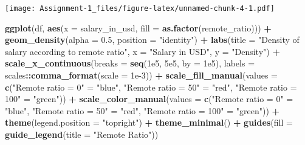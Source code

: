 \documentclass[
]{article}
\newenvironment{Shaded}{\begin{snugshade}}{\end{snugshade}}
\newcommand{\AttributeTok}[1]{\textcolor[rgb]{0.13,0.29,0.53}{#1}}
\newcommand{\FloatTok}[1]{\textcolor[rgb]{0.00,0.00,0.81}{#1}}
\newcommand{\FunctionTok}[1]{\textcolor[rgb]{0.13,0.29,0.53}{\textbf{#1}}}
\newcommand{\NormalTok}[1]{#1}
\newcommand{\OtherTok}[1]{\textcolor[rgb]{0.56,0.35,0.01}{#1}}
\newcommand{\SpecialCharTok}[1]{\textcolor[rgb]{0.81,0.36,0.00}{\textbf{#1}}}
\newcommand{\StringTok}[1]{\textcolor[rgb]{0.31,0.60,0.02}{#1}}
\begin{document}
\texttt{[image: Assignment-1\_files/figure-latex/unnamed-chunk-4-1.pdf]}

\begin{Shaded}
\begin{Highlighting}[]
\FunctionTok{ggplot}\NormalTok{(df, }\FunctionTok{aes}\NormalTok{(}\AttributeTok{x =}\NormalTok{ salary\_in\_usd, }\AttributeTok{fill =} \FunctionTok{as.factor}\NormalTok{(remote\_ratio))) }\SpecialCharTok{+}
  \FunctionTok{geom\_density}\NormalTok{(}\AttributeTok{alpha =} \FloatTok{0.5}\NormalTok{, }\AttributeTok{position =} \StringTok{"identity"}\NormalTok{) }\SpecialCharTok{+}
  \FunctionTok{labs}\NormalTok{(}\AttributeTok{title =} \StringTok{"Density of salary according to remote ratio"}\NormalTok{,}
       \AttributeTok{x =} \StringTok{"Salary in USD"}\NormalTok{,}
       \AttributeTok{y =} \StringTok{"Density"}\NormalTok{) }\SpecialCharTok{+}
  \FunctionTok{scale\_x\_continuous}\NormalTok{(}\AttributeTok{breaks =} \FunctionTok{seq}\NormalTok{(}\FloatTok{1e5}\NormalTok{, }\FloatTok{5e5}\NormalTok{, }\AttributeTok{by =} \FloatTok{1e5}\NormalTok{),}
                     \AttributeTok{labels =}\NormalTok{ scales}\SpecialCharTok{::}\FunctionTok{comma\_format}\NormalTok{(}\AttributeTok{scale =} \FloatTok{1e{-}3}\NormalTok{)) }\SpecialCharTok{+}
  \FunctionTok{scale\_fill\_manual}\NormalTok{(}\AttributeTok{values =} \FunctionTok{c}\NormalTok{(}\StringTok{"Remote ratio = 0"} \OtherTok{=} \StringTok{"blue"}\NormalTok{,}
                               \StringTok{"Remote ratio = 50"} \OtherTok{=} \StringTok{"red"}\NormalTok{,}
                               \StringTok{"Remote ratio = 100"} \OtherTok{=} \StringTok{"green"}\NormalTok{)) }\SpecialCharTok{+}
  \FunctionTok{scale\_color\_manual}\NormalTok{(}\AttributeTok{values =} \FunctionTok{c}\NormalTok{(}\StringTok{"Remote ratio = 0"} \OtherTok{=} \StringTok{"blue"}\NormalTok{,}
                                \StringTok{"Remote ratio = 50"} \OtherTok{=} \StringTok{"red"}\NormalTok{,}
                                \StringTok{"Remote ratio = 100"} \OtherTok{=} \StringTok{"green"}\NormalTok{)) }\SpecialCharTok{+}
  \FunctionTok{theme}\NormalTok{(}\AttributeTok{legend.position =} \StringTok{"topright"}\NormalTok{) }\SpecialCharTok{+}
  \FunctionTok{theme\_minimal}\NormalTok{() }\SpecialCharTok{+} 
  \FunctionTok{guides}\NormalTok{(}\AttributeTok{fill =} \FunctionTok{guide\_legend}\NormalTok{(}\AttributeTok{title =} \StringTok{"Remote Ratio"}\NormalTok{))}
\end{Highlighting}
\end{Shaded}
\end{document}
